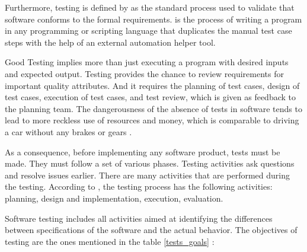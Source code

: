 Furthermore, testing is defined by \cite{huang2003automated} as the standard process used to validate that software conforms to the formal requirements. \cite{vijayasree2022review} is the process of writing a program in any programming or scripting language that duplicates the manual test case steps with the help of an external automation helper tool. 

Good Testing implies more than just executing a program with desired inputs and expected output. Testing provides the chance to review requirements for important quality attributes. And it requires the planning of test cases, design of test cases, execution of test cases, and test review, which is given as feedback to the planning team. The dangerousness of the absence of tests in software tends to lead to more reckless use of resources and money, which is comparable to driving a car without any brakes or gears \cite{madhavi2016white}.

As  a consequence, before implementing any software product, tests must be made. They must follow a set of various phases. Testing activities ask questions and resolve issues earlier. There are many activities that are performed during the testing. According to \cite{jindal2016importance,pocatilu2002automated}, the testing process has the following activities: planning, design and implementation, execution, evaluation.

Software testing includes all activities aimed at identifying the differences between specifications of the software and the actual behavior.  The objectives of testing are the ones mentioned in the table \ref{tests_goals} 
\cite{anand2019importance, huang2003automated, hussain2015comparative}:

